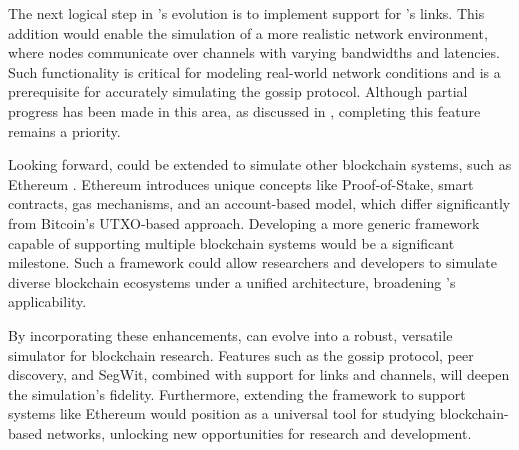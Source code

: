 The next logical step in \iblock{}'s evolution is to implement support for
\omnetpp{}'s links. This addition would enable the simulation of a more
realistic network environment, where nodes communicate over channels with
varying bandwidths and latencies. Such functionality is critical for modeling
real-world network conditions and is a prerequisite for accurately simulating
the gossip protocol. Although partial progress has been made in this area, as
discussed in , completing this feature remains a
priority.

Looking forward, \iblock{} could be extended to simulate other blockchain
systems, such as Ethereum \cite{ethereum}. Ethereum introduces unique concepts
like Proof-of-Stake, smart contracts, gas mechanisms, and an account-based
model, which differ significantly from Bitcoin's UTXO-based approach.
Developing a more generic framework capable of supporting multiple blockchain
systems would be a significant milestone. Such a framework could allow
researchers and developers to simulate diverse blockchain ecosystems under a
unified architecture, broadening \iblock{}'s applicability.

By incorporating these enhancements, \iblock{} can evolve into a robust,
versatile simulator for blockchain research. Features such as the gossip
protocol, peer discovery, and SegWit, combined with support for \omnetpp{}
links and channels, will deepen the simulation's fidelity. Furthermore,
extending the framework to support systems like Ethereum would position
\iblock{} as a universal tool for studying blockchain-based networks, unlocking
new opportunities for research and development.


